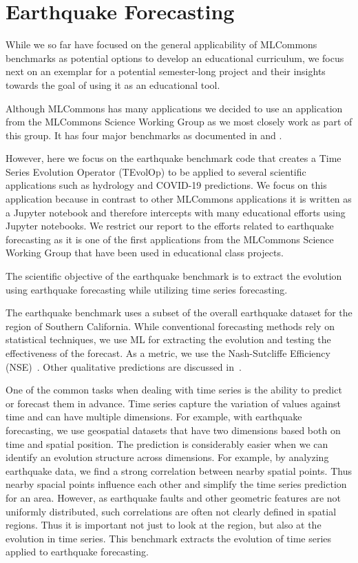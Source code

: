 \section{Earthquake Forecasting}
\label{sec:eq}

While we so far have focused on the general applicability of MLCommons benchmarks as potential options to develop an educational curriculum, we focus next on an exemplar for a potential semester-long project and their insights towards the goal of using it as an educational tool.

Although MLCommons has many applications we decided to use an application from the MLCommons Science Working Group as we most closely work as part of this group. It has four major benchmarks as documented in \cite{las-22-mlcommons-science} and \cite{las-2023-escience}. 

However, here we focus on the earthquake benchmark code that creates a Time  Series Evolution Operator (TEvolOp) to be applied to several scientific applications such as hydrology and COVID-19 predictions. We focus on this application because in contrast to other MLCommons applications it is written as a Jupyter notebook and therefore intercepts with many educational efforts using Jupyter notebooks. We restrict our report to the efforts related to earthquake forecasting as it is one of the first applications from the MLCommons Science Working Group that have been used in educational class projects. 

The scientific objective of the earthquake benchmark is to extract the evolution using earthquake forecasting while utilizing time series forecasting.

The earthquake benchmark uses a subset of the overall earthquake dataset for the region of Southern California. While conventional forecasting methods rely on statistical techniques, we use ML for extracting the evolution and testing the effectiveness of the forecast. As a metric, we use the Nash-Sutcliffe Efficiency (NSE)~\citep{nash-79}. Other qualitative predictions are discussed in~\citep{fox2022-jm}.

One of the common tasks when dealing with time series is the ability to predict or forecast them in advance. Time series capture the variation of values against time and can have multiple dimensions. For example, with earthquake forecasting, we use geospatial datasets that have two dimensions based both on time and spatial position. The prediction is considerably easier when we can identify an evolution structure across dimensions. For example, by analyzing earthquake data, we find a strong correlation between nearby spatial points. Thus nearby spacial points influence each other and simplify the time series prediction for an area. However, as earthquake faults and other geometric features are not uniformly distributed, such correlations are often not clearly defined in spatial regions. Thus it is important not just to look at the region, but also at the evolution in time series. This benchmark extracts the evolution of time series applied to earthquake forecasting.



